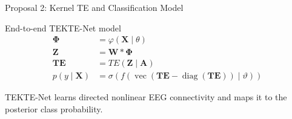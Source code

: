 \documentclass[aspectratio=169]{beamer}
\let\oldcite\cite
\renewcommand{\cite}[1]{{\tiny\oldcite{#1}}}
\begin{document}
\begin{frame}{Proposal 2: Kernel TE and Classification Model}
\begin{block}{End-to-end TEKTE-Net model {\scriptsize \cite{takens1981detecting,goodfellow2016deep}}}
\centering
\begin{subequations}
\begin{align*}
\boldsymbol{\Phi}
&=
\varphi(\mathbf{X}\mid\theta)
\\
\mathbf{Z}
&=
\mathbf{W}*\boldsymbol{\Phi}
\\
\mathbf{TE}
&=
TE(\mathbf{Z}\mid\mathbf{A})
\\
p(y\mid\mathbf{X})
&=
\sigma
\left(
f
\left(
\operatorname{vec}
\left(
\mathbf{TE}
-
\operatorname{diag}(\mathbf{TE})
\right)
\mid
\vartheta
\right)
\right)
\end{align*}
\end{subequations}
\end{block}

\vspace{0.04cm}

{\centering
\footnotesize
\textcolor{frameblue}{
TEKTE-Net learns directed nonlinear EEG connectivity and maps it to the posterior class probability.
}
\par}

\end{frame}
\end{document}
